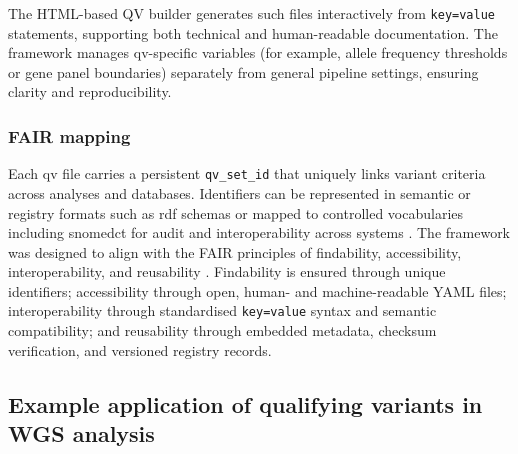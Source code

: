 The HTML-based QV builder generates such files interactively from \texttt{key=value} statements, supporting both technical and human-readable documentation. 
The framework manages \ac{qv}-specific variables (for example, allele frequency thresholds or gene panel boundaries) separately from general pipeline settings, ensuring clarity and reproducibility.

\subsubsection*{FAIR mapping}

Each \ac{qv} file carries a persistent \texttt{qv\_set\_id} that uniquely links variant criteria across analyses and databases. 
Identifiers can be represented in semantic or registry formats such as \ac{rdf} schemas \cite{toure2023fairification} or mapped to controlled vocabularies including \ac{snomedct} for audit and interoperability across systems \cite{van2023bridging}. 
The framework was designed to align with the FAIR principles of findability, accessibility, interoperability, and reusability \cite{wilkinson2016fair}. 
Findability is ensured through unique identifiers; accessibility through open, human- and machine-readable YAML files; interoperability through standardised \texttt{key=value} syntax and semantic compatibility; and reusability through embedded metadata, checksum verification, and versioned registry records.


\subsection{Example application of qualifying variants in WGS analysis}

